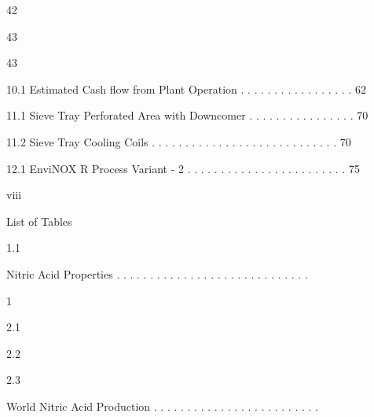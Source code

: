 \documentclass[a4paper,portrait,12pt]{article}
\begin{document}
42


43


43





\begin{flushleft}
10.1 Estimated Cash flow from Plant Operation . . . . . . . . . . . . . . . . . 62
\end{flushleft}


\begin{flushleft}
11.1 Sieve Tray Perforated Area with Downcomer . . . . . . . . . . . . . . . . 70
\end{flushleft}


\begin{flushleft}
11.2 Sieve Tray Cooling Coils . . . . . . . . . . . . . . . . . . . . . . . . . . . . 70
\end{flushleft}


\begin{flushleft}
12.1 EnviNOX R Process Variant - 2 . . . . . . . . . . . . . . . . . . . . . . . . 75
\end{flushleft}





\begin{flushleft}
viii
\end{flushleft}





\begin{flushleft}
\newpage
List of Tables
\end{flushleft}


1.1





\begin{flushleft}
Nitric Acid Properties . . . . . . . . . . . . . . . . . . . . . . . . . . . . .
\end{flushleft}





1





2.1


2.2


2.3





\begin{flushleft}
World Nitric Acid Production . . . . . . . . . . . . . . . . . . . . . . . . .
\end{flushleft}
\end{document}
